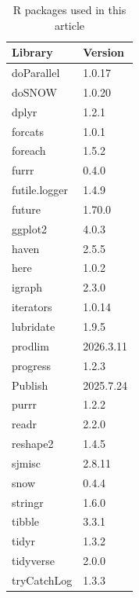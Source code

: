 \begin{table}

\caption{\label{tab:tab:packages}R packages used in this article}
\centering
\begin{tabular}[t]{ll}
\toprule
Library & Version\\
\midrule
doParallel & 1.0.17\\
doSNOW & 1.0.20\\
dplyr & 1.2.1\\
forcats & 1.0.1\\
foreach & 1.5.2\\
\addlinespace
furrr & 0.4.0\\
futile.logger & 1.4.9\\
future & 1.70.0\\
ggplot2 & 4.0.3\\
haven & 2.5.5\\
\addlinespace
here & 1.0.2\\
igraph & 2.3.0\\
iterators & 1.0.14\\
lubridate & 1.9.5\\
prodlim & 2026.3.11\\
\addlinespace
progress & 1.2.3\\
Publish & 2025.7.24\\
purrr & 1.2.2\\
readr & 2.2.0\\
reshape2 & 1.4.5\\
\addlinespace
sjmisc & 2.8.11\\
snow & 0.4.4\\
stringr & 1.6.0\\
tibble & 3.3.1\\
tidyr & 1.3.2\\
\addlinespace
tidyverse & 2.0.0\\
tryCatchLog & 1.3.3\\
\bottomrule
\end{tabular}
\end{table}